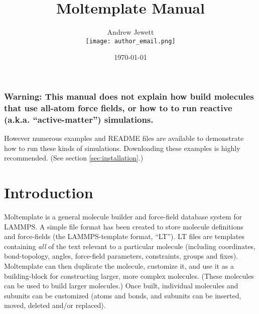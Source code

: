\documentclass[11pt]{article}
\begin{document}
\author{
  Andrew Jewett \\
  \texttt{[image: author\_email.png]}
}
\date \today


\title{Moltemplate Manual}



\maketitle


\tableofcontents


\subsubsection*{Warning:
  This manual does not explain how build molecules that use
  all-atom force fields, or how to to run reactive (a.k.a. ``active-matter'')
  simulations.}
However numerous examples and README files are available to
demonstrate how to run these kinds of simulations.
Downloading these examples is highly recommended.
(See section \ref{sec:installation}.)

\section{Introduction}



Moltemplate is a general molecule builder and force-field database system for LAMMPS.  A simple file format has been created to store molecule definitions and force-fields (the LAMMPS-template format, “LT”). 
LT files are templates containing \textit{all} of the text relevant to a particular molecule (including coordinates, bond-topology, angles, force-field parameters, constraints, groups and fixes).  Moltemplate can then duplicate the molecule, customize it, and use it as a building-block for constructing larger, more complex molecules.  (These molecules can be used to build larger molecules.)  Once built, individual molecules and subunits can be customized (atoms and bonds, and subunits can be inserted, moved, deleted and/or replaced).
\end{document}
